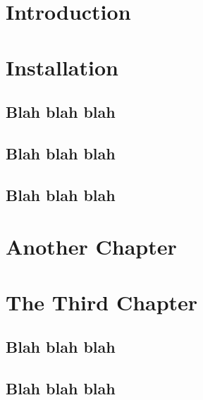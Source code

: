 


    \makecoverpage
    \setcounter{tocdepth}{1}
    \sffamily{\tableofcontents}
    \clearpage
    \pagestyle{plain}
    \rmfamily\mdseries\normalsize

    \chapter*{Introduction}

    \lipsum[1]

    \lipsum[1]



    \chapter{Installation}
    \lipsum[1]
    
    \section{Blah blah blah}
    \lipsum[1]
    
    \section{Blah blah blah}
    \lipsum[1]
    
    \section{Blah blah blah}
    \lipsum[1]



    \chapter{Another Chapter}
    \lipsum[1]
    
    \lipsum[1]



    \chapter{The Third Chapter}
    \lipsum[1]
    
    \section{Blah blah blah}
    \lipsum[1]
    
    \section{Blah blah blah}
    \lipsum[1]



